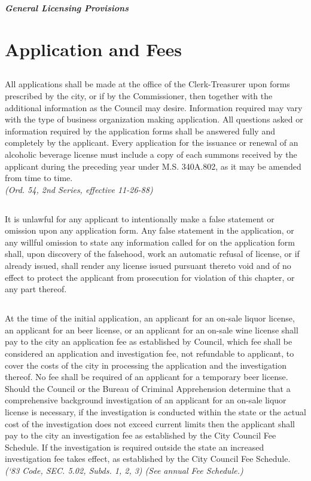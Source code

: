 \begin{center}
    \emph{\textbf{\LARGE{General Licensing Provisions}}}
\end{center}

\setcounter{section}{14}
\section{Application and Fees}
\subsection{}
All applications shall be made at the office of the Clerk-Treasurer upon forms prescribed by the city, or if by the Commissioner, then together with the additional information as the Council may desire. Information required may vary with the type of business organization making application. All questions asked or information required by the application forms shall be answered fully and completely by the applicant. Every application for the issuance or renewal of an alcoholic beverage license must include a copy of each summons received by the applicant during the preceding year under M.S. \textsection 340A.802, as it may be amended from time to time.\\
\emph{(Ord. 54, 2nd Series, effective 11-26-88)}
\subsection{}
It is unlawful for any applicant to intentionally make a false statement or omission upon any application form. Any false statement in the application, or any willful omission to state any information called for on the application form shall, upon discovery of the falsehood, work an automatic refusal of license, or if already issued, shall render any license issued pursuant thereto void and of no effect to protect the applicant from prosecution for violation of this chapter, or any part thereof.
\subsection{}
At the time of the initial application, an applicant for an on-sale liquor license, an applicant for an beer license, or an applicant for an on-sale wine license shall pay to the city an application fee as established by Council, which fee shall be considered an application and investigation fee, not refundable to applicant, to cover the costs of the city in processing the application and the investigation thereof. No fee shall be required of an applicant for a temporary beer license. Should the Council or the Bureau of Criminal Apprehension determine that a comprehensive background investigation of an applicant for an on-sale liquor license is necessary, if the investigation is conducted within the state or the actual cost of the investigation does not exceed current limits then the applicant shall pay to the city an investigation fee as established by the City Council Fee Schedule. If the investigation is required outside the state an increased investigation fee takes effect, as established by the City Council Fee Schedule.\\
\emph{(‘83 Code, SEC. 5.02, Subds. 1, 2, 3) (See annual Fee Schedule.)}
